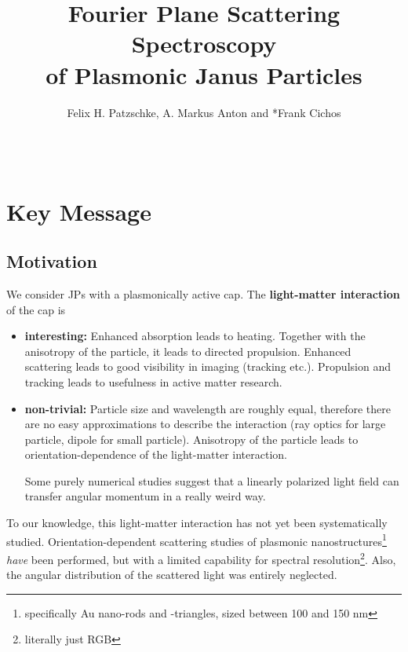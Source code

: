 \documentclass[10pt]{article}
\title{\sffamily\bfseries\color{Maroon} Fourier Plane Scattering Spectroscopy\\of Plasmonic Janus Particles}
\author{Felix H. Patzschke, A. Markus Anton and *Frank Cichos}
\date{}
\begin{document}

\maketitle

\begin{abstract}\sffamily \vspace{-1em}  \\ \end{abstract}





\section*{Key Message}

\subsection*{Motivation}
We consider JPs with a plasmonically active cap. 
The \textbf{light-matter interaction} of the cap is 
\begin{itemize}
    \item \textbf{interesting:} 
    Enhanced absorption leads to heating.
    Together with the anisotropy of the particle, it leads to directed propulsion.
    Enhanced scattering leads to good visibility in imaging (tracking etc.).
    Propulsion and tracking leads to usefulness in active matter research. 
    \item \textbf{non-trivial:}
    Particle size and wavelength are roughly equal, therefore there are no easy approximations to describe the interaction (ray optics for large particle, dipole for small particle).
    Anisotropy of the particle leads to orientation-dependence of the light-matter interaction. 

    Some purely numerical studies suggest that a linearly polarized light field can transfer angular momentum in a really weird way. 
\end{itemize}

To our knowledge, this light-matter interaction has not yet been systematically studied. 
Orientation-dependent scattering studies of plasmonic nanostructures\footnote{specifically Au nano-rods and -triangles, sized between 100 and 150 nm} \emph{have} been performed, \cite{Islam2021} but with a limited capability for spectral resolution\footnote{literally just RGB}. 
Also, the angular distribution of the scattered light was entirely neglected. 
\\ 
\end{document}
